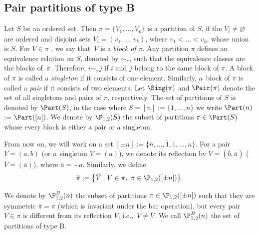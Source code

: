 \subsection{Pair partitions of type B}

Let $S$ be an ordered set. Then $\pi = \{ V_1,\dots, V_p\}$ is a partition of $S$, if the $V_i \neq \varnothing$ are
ordered and disjoint sets $V_i=(v_1,\dots,v_k)$, where $v_1<\dots<v_k$, whose union is $S$.
For $V \in \pi$ , we say that~$V$ is a \emph{block of $\pi$}.
Any partition $\pi$ defines an equivalence relation on $S$,
denoted by $\sim_\pi$, such that the equivalence classes are the
blocks of~$\pi$.
Therefore, $i\sim_\pi j$ if $i$ and $j$ belong to the same block of $\pi$.
A block of $\pi$ is called a \emph{singleton} if it consists of one element.
Similarly, a~block of $\pi$ is called a \emph{pair} if it consists of two elements.
Let $\Sing(\pi)$ and $\Pair(\pi)$ denote the set of all singletons and pairs of $\pi$, respectively.
The set of partitions of $S$ is denoted by $\Part(S)$, in the case where $S =
[n] := \{1, \dots , n\}$ we write $\Part(n)$ := $\Part([n])$.
We denote by $\P_{1,2}(S)$ the subset of partitions $\pi \in \Part(S)$ whose every block is either a
pair or a singleton.

From now on, we will work on a set $[\pm n]:=\{\bar n, \dots , \bar 1, 1,\dots, n\}$.
For a pair $V=(a,b)$ (or a~singleton $V=(a)$), we denote its reflection by $\overline V=(\bar b , \bar a)$ ($\overline V=( \bar a)$), where $\bar a =-a$.
Similarly, we define
\[
\bar \pi: =\big\{\overline{V}\mid V\in \pi,\text{ } \pi \in \P_{1,2}([\pm n])\big\}.
\]

\begin{Definition} \label{def:partycji}
	We denote by $\P_{1,2}^{B}(n)$ the subset of partitions $\pi \in \P_{1,2}([\pm n])$
	such that they are symmetric $\overline{\pi} =
	\pi$ (which is invariant under the bar operation), but every pair $V \in \pi$ is different from its reflection
	$\overline{V}$, i.e.,~$V \neq \overline{V}$.
	We call $\P_{1,2}^{B}(n)$ the set of partitions of type B.
\end{Definition}

